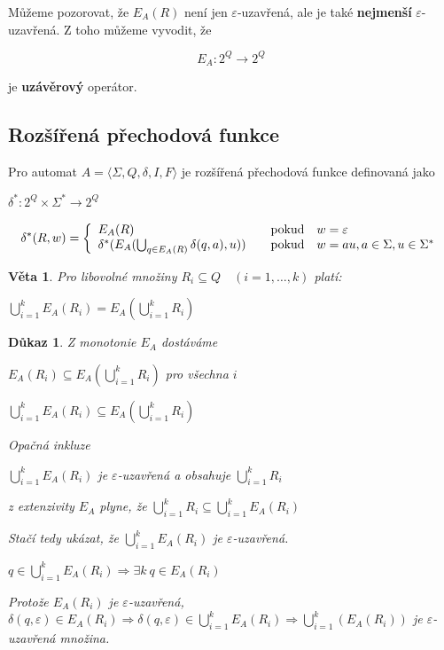 \documentclass[10pt, a4paper, titlepage]{article}
\theoremstyle{note}
\newtheorem{dukaz}{Důkaz}
\newtheorem{veta}{Věta}
\begin{document}
Můžeme pozorovat, že $E_A(R)$ není jen $\varepsilon$-uzavřená, ale je také \textbf{nejmenší} $\varepsilon$-uzavřená. Z toho můžeme vyvodit, že 

$$E_A:2^Q \rightarrow 2^Q$$

je \textbf{uzávěrový} operátor.

\subsection{Rozšířená přechodová funkce}

Pro automat $A = \langle \Sigma,Q,\delta,I,F \rangle$ je rozšířená přechodová funkce definovaná jako

$\delta^*:2^Q \times \Sigma^* \rightarrow 2^Q$

$$
\delta^*(R,w)=\left\{
\begin{array}{l@{\quad\mbox{}\quad}l}
E_A(R) & \text{pokud}\quad w=\varepsilon\\
\delta^*(E_A(\bigcup_{q \in E_A(R)}\delta(q,a),u))& \text{pokud}\quad w=au,a\in\Sigma,u\in\Sigma^*\\
\end{array}
\right.
$$

\begin{veta}
Pro libovolné množiny $R_i \subseteq Q \quad (i=1,\ldots,k)$ platí:

$\bigcup_{i=1}^k E_A(R_i)=E_A(\bigcup_{i=1}^kR_i)$
\end{veta}

\begin{dukaz}
Z monotonie $E_A$ dostáváme

\quad$E_A(R_i) \subseteq E_A(\bigcup_{i=1}^k R_i)$ pro všechna $i$

\quad$\bigcup_{i=1}^kE_A(R_i) \subseteq E_A(\bigcup_{i=1}^k R_i)$

Opačná inkluze

\quad$\bigcup_{i=1}^kE_A(R_i)$ je $\varepsilon$-uzavřená a obsahuje $\bigcup_{i=1}^k R_i$

z extenzivity $E_A$ plyne, že $\bigcup_{i=1}^k R_i \subseteq \bigcup_{i=1}^k E_A(R_i)$

Stačí tedy ukázat, že $\bigcup_{i=1}^k E_A(R_i)$ je $\varepsilon$-uzavřená.

\quad$q \in \bigcup_{i=1}^k E_A(R_i) \Rightarrow \exists k \ q \in E_A(R_i)$

Protože $E_A(R_i)$ je $\varepsilon$-uzavřená, $\delta(q,\varepsilon) \in E_A(R_i) \Rightarrow \delta(q,\varepsilon) \in \bigcup_{i=1}^k E_A(R_i) \Rightarrow \bigcup_{i=1}^k(E_A(R_i))$ je $\varepsilon$-uzavřená množina.
\end{dukaz}
\end{document}
